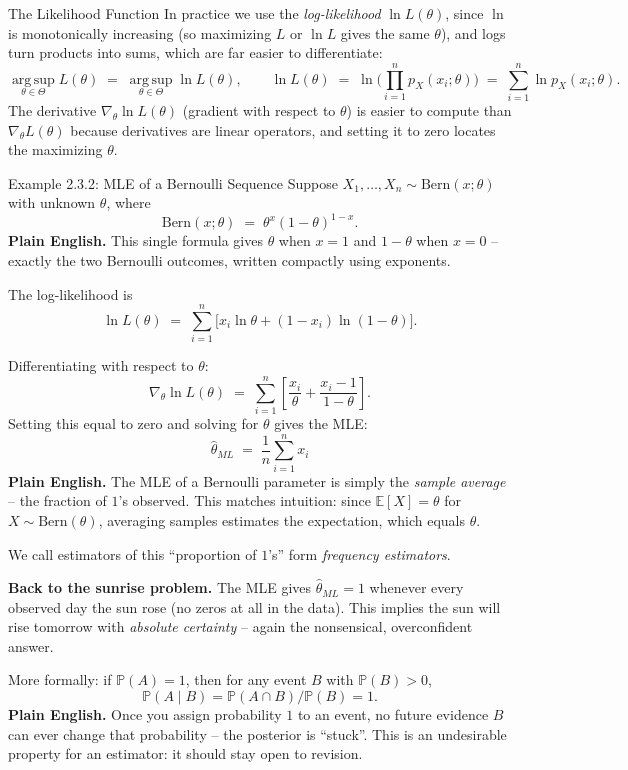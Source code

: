 \documentclass[aspectratio=169,10pt]{beamer}
\begin{document}
\begin{frame}[allowframebreaks]{The Likelihood Function}
  In practice we use the \emph{log-likelihood} $\ln L(\theta)$, since $\ln$
  is monotonically increasing (so maximizing $L$ or $\ln L$ gives the same
  $\theta$), and logs turn products into sums, which are far easier to
  differentiate:
  \[
    \operatorname*{arg\,sup}_{\theta \in \Theta} L(\theta)
    \;=\; \operatorname*{arg\,sup}_{\theta \in \Theta} \ln L(\theta),
    \qquad
    \ln L(\theta) \;=\; \ln\!\Big(\prod_{i=1}^n p_X(x_i;\theta)\Big) \;=\; \sum_{i=1}^n \ln p_X(x_i;\theta).
  \]
  The derivative $\nabla_\theta \ln L(\theta)$ (gradient with respect to
  $\theta$) is easier to compute than $\nabla_\theta L(\theta)$ because
  derivatives are linear operators, and setting it to zero locates the
  maximizing $\theta$.
\end{frame}

\begin{frame}[allowframebreaks]{Example 2.3.2: MLE of a Bernoulli Sequence}
  Suppose $X_1,\dots,X_n \sim \mathrm{Bern}(x;\theta)$ with unknown
  $\theta$, where
  \[
    \mathrm{Bern}(x;\theta) \;=\; \theta^x (1-\theta)^{1-x}.
  \]
  \textbf{Plain English.} This single formula gives $\theta$ when $x=1$ and
  $1-\theta$ when $x=0$ -- exactly the two Bernoulli outcomes, written
  compactly using exponents.

  The log-likelihood is
  \[
    \ln L(\theta) \;=\; \sum_{i=1}^n \big[x_i \ln\theta + (1-x_i)\ln(1-\theta)\big].
  \]

  \framebreak

  Differentiating with respect to $\theta$:
  \[
    \nabla_\theta \ln L(\theta) \;=\; \sum_{i=1}^n \left[\frac{x_i}{\theta} + \frac{x_i - 1}{1-\theta}\right].
  \]
  Setting this equal to zero and solving for $\theta$ gives the MLE:
  \[
    \boxed{\widehat{\theta}_{ML} \;=\; \frac{1}{n}\sum_{i=1}^n x_i}
  \]
  \textbf{Plain English.} The MLE of a Bernoulli parameter is simply the
  \emph{sample average} -- the fraction of $1$'s observed. This matches
  intuition: since $\mathbb{E}[X]=\theta$ for $X \sim \mathrm{Bern}(\theta)$,
  averaging samples estimates the expectation, which equals $\theta$.

  We call estimators of this ``proportion of $1$'s'' form \emph{frequency
  estimators}.

  \framebreak

  \textbf{Back to the sunrise problem.} The MLE gives $\widehat{\theta}_{ML}
  = 1$ whenever every observed day the sun rose (no zeros at all in the
  data). This implies the sun will rise tomorrow with \emph{absolute
  certainty} -- again the nonsensical, overconfident answer.

  More formally: if $\mathbb{P}(A)=1$, then for any event $B$ with
  $\mathbb{P}(B)>0$,
  \[
    \mathbb{P}(A\mid B) = \mathbb{P}(A \cap B)/\mathbb{P}(B) = 1.
  \]
  \textbf{Plain English.} Once you assign probability $1$ to an event, no
  future evidence $B$ can ever change that probability -- the posterior is
  ``stuck''. This is an undesirable property for an estimator: it should
  stay open to revision.
\end{frame}
\end{document}
